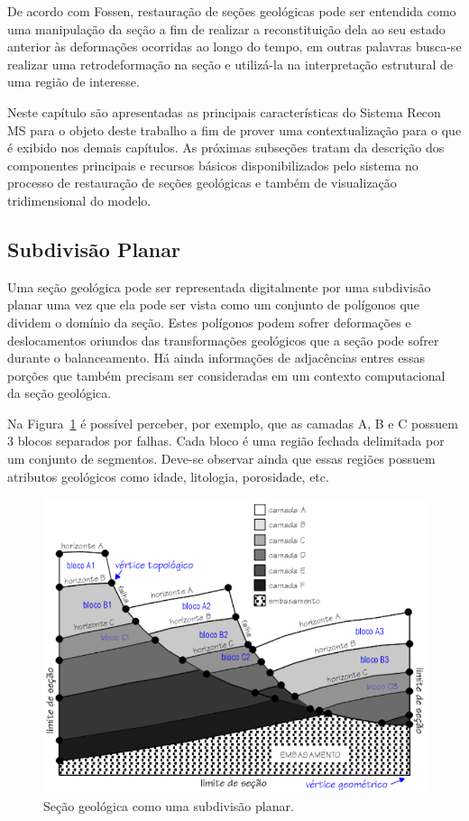 De acordo com Fossen\cite{Fossen}, restauração de seções geológicas pode ser entendida como uma manipulação da seção a fim de realizar a reconstituição dela ao seu estado anterior às deformações ocorridas ao longo do tempo, em outras palavras busca-se realizar uma retrodeformação na seção e utilizá-la na interpretação estrutural de uma região de interesse.

Neste capítulo são apresentadas as principais características do Sistema Recon MS para o objeto deste trabalho a fim de prover uma contextualização para o que é exibido nos demais capítulos. As próximas subseções tratam da descrição dos componentes principais e recursos básicos disponibilizados pelo sistema no processo de restauração de seções geológicas e também de visualização tridimensional do modelo. 

\subsection{Subdivisão Planar} %

Uma seção geológica pode ser representada digitalmente por uma subdivisão planar uma vez que ela pode ser vista como um conjunto de polígonos que dividem o domínio da seção. Estes polígonos podem sofrer deformações e deslocamentos oriundos das transformações geológicos que a seção pode sofrer durante o balanceamento. Há ainda informações de adjacências entres essas porções que também precisam ser consideradas em um contexto computacional da seção geológica.

Na Figura~\ref{fig-subdivisao-planar} é possível perceber, por exemplo, que as camadas A, B e C possuem 3 blocos separados por falhas. Cada bloco é uma região fechada delimitada por um conjunto de segmentos. Deve-se observar ainda que essas regiões possuem atributos geológicos como idade, litologia, porosidade, etc.

\begin{figure} [h]
  \begin{center}
    \includegraphics[width=400pt]{images/fig-subdivisao-planar}
    \caption{Seção geológica como uma subdivisão planar.\cite{Ferraz}}\label{fig-subdivisao-planar}
  \end{center}
\end{figure}

